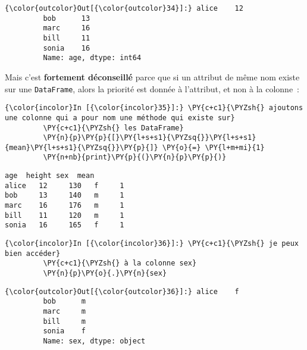 \begin{Verbatim}[commandchars=\\\{\},frame=single,framerule=0.3mm,rulecolor=\color{cellframecolor}]
{\color{outcolor}Out[{\color{outcolor}34}]:} alice    12
         bob      13
         marc     16
         bill     11
         sonia    16
         Name: age, dtype: int64
\end{Verbatim}
            
    Mais c'est \textbf{fortement déconseillé} parce que si un attribut de
même nom existe sur une \texttt{DataFrame}, alors la priorité est donnée
à l'attribut, et non à la colonne~:

    \begin{Verbatim}[commandchars=\\\{\},frame=single,framerule=0.3mm,rulecolor=\color{cellframecolor}]
{\color{incolor}In [{\color{incolor}35}]:} \PY{c+c1}{\PYZsh{} ajoutons une colonne qui a pour nom une méthode qui existe sur}
         \PY{c+c1}{\PYZsh{} les DataFrame}
         \PY{n}{p}\PY{p}{[}\PY{l+s+s1}{\PYZsq{}}\PY{l+s+s1}{mean}\PY{l+s+s1}{\PYZsq{}}\PY{p}{]} \PY{o}{=} \PY{l+m+mi}{1}
         \PY{n+nb}{print}\PY{p}{(}\PY{n}{p}\PY{p}{)}
\end{Verbatim}


    \begin{Verbatim}[commandchars=\\\{\},frame=single,framerule=0.3mm,rulecolor=\color{cellframecolor}]
       age  height sex  mean
alice   12     130   f     1
bob     13     140   m     1
marc    16     176   m     1
bill    11     120   m     1
sonia   16     165   f     1
\end{Verbatim}

    \begin{Verbatim}[commandchars=\\\{\},frame=single,framerule=0.3mm,rulecolor=\color{cellframecolor}]
{\color{incolor}In [{\color{incolor}36}]:} \PY{c+c1}{\PYZsh{} je peux bien accéder}
         \PY{c+c1}{\PYZsh{} à la colonne sex}
         \PY{n}{p}\PY{o}{.}\PY{n}{sex}
\end{Verbatim}


\begin{Verbatim}[commandchars=\\\{\},frame=single,framerule=0.3mm,rulecolor=\color{cellframecolor}]
{\color{outcolor}Out[{\color{outcolor}36}]:} alice    f
         bob      m
         marc     m
         bill     m
         sonia    f
         Name: sex, dtype: object
\end{Verbatim}
            
